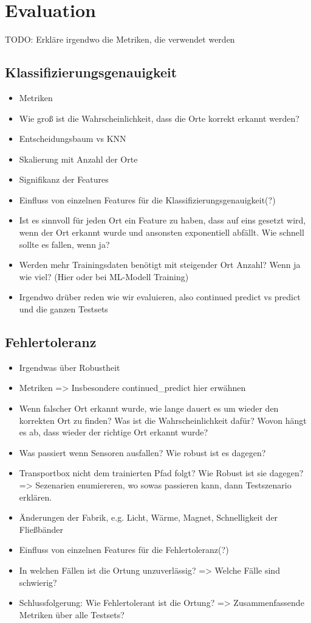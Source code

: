 \chapter{Evaluation}
TODO: Erkläre irgendwo die Metriken, die verwendet werden

\section{Klassifizierungsgenauigkeit}
\begin{itemize}
    \item Metriken
    \item Wie groß ist die Wahrscheinlichkeit, dass die Orte korrekt erkannt werden?
    \item Entscheidungsbaum vs KNN
    \item Skalierung mit Anzahl der Orte
    \item Signifikanz der Features
    \item Einfluss von einzelnen Features für die Klassifizierungsgenauigkeit(?)
    \item Ist es sinnvoll für jeden Ort ein Feature zu haben, dass auf eins gesetzt wird, wenn der Ort erkannt wurde und ansonsten exponentiell abfällt. Wie schnell sollte es fallen, wenn ja?
    \item Werden mehr Trainingsdaten benötigt mit steigender Ort Anzahl? Wenn ja wie viel? (Hier oder bei ML-Modell Training)
    \item Irgendwo drüber reden wie wir evaluieren, also continued predict vs predict und die ganzen Testsets
\end{itemize}

\section{Fehlertoleranz}
\begin{itemize}
    \item Irgendwas über Robustheit
    \item Metriken => Insbesondere continued\_predict hier erwähnen
    \item Wenn falscher Ort erkannt wurde, wie lange dauert es um wieder den korrekten Ort zu finden? Was ist die Wahrscheinlichkeit dafür? Wovon hängt es ab, dass wieder der richtige Ort erkannt wurde?
    \item Was passiert wenn Sensoren ausfallen? Wie robust ist es dagegen?
    \item Transportbox nicht dem trainierten Pfad folgt? Wie Robust ist sie dagegen? => Sezenarien enumiereren, wo sowas passieren kann, dann Testszenario erklären.
    \item Änderungen der Fabrik, e.g. Licht, Wärme, Magnet, Schnelligkeit der Fließbänder
    \item Einfluss von einzelnen Features für die Fehlertoleranz(?)
    \item In welchen Fällen ist die Ortung unzuverlässig? => Welche Fälle sind schwierig?
    \item Schlussfolgerung: Wie Fehlertolerant ist die Ortung? => Zusammenfassende Metriken über alle Testsets?
\end{itemize}

